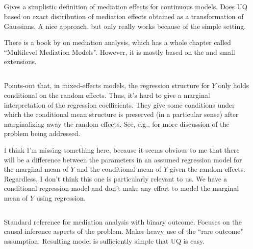 \documentclass{article}
\begin{document}
\subsection{\citet{Ken03}}

Gives a simplistic definition of mediation effects for continuous models. Does UQ based on exact distribution of mediation effects obtained as a transformation of Gaussians. A nice approach, but only really works because of the simple setting.

There is a book by \citet{Mac17} on mediation analysis, which has a whole chapter called ``Multilevel Mediation Models''. However, it is mostly based on the \citet{Ken03} and small extensions. 

\subsection{\citet{Rit04}}

Points-out that, in mixed-effects models, the regression structure for $Y$ only holds conditional on the random effects. Thus, it's hard to give a marginal interpretation of the regression coefficients. They give some conditions under which the conditional mean structure is preserved (in a particular sense) after marginalizing away the random effects. See, e.g., \citet{Neu91} for more discussion of the problem being addressed.

I think I'm missing something here, because it seems obvious to me that there will be a difference between the parameters in an assumed regression model for the marginal mean of $Y$ and the conditional mean of $Y$ given the random effects. Regardless, I don't think this one is particularly relevant to us. We have a conditional regression model and don't make any effort to model the marginal mean of $Y$ using regression.


\subsection{\citet{Van10}}

Standard reference for mediation analysis with binary outcome. Focuses on the causal inference aspects of the problem. Makes heavy use of the ``rare outcome'' assumption. Resulting model is sufficiently simple that UQ is easy.


\subsection{\citet{Pea12}}
\end{document}
